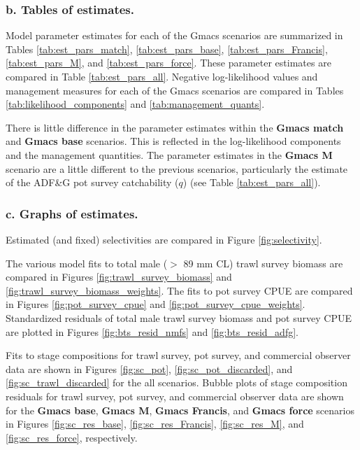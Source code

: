 \documentclass[]{article}
\begin{document}
\subsubsection{b. Tables of estimates.}\label{b.-tables-of-estimates.}

Model parameter estimates for each of the Gmacs scenarios are summarized
in Tables \ref{tab:est_pars_match}, \ref{tab:est_pars_base},
\ref{tab:est_pars_Francis}, \ref{tab:est_pars_M}, and
\ref{tab:est_pars_force}. These parameter estimates are compared in
Table \ref{tab:est_pars_all}. Negative log-likelihood values and
management measures for each of the Gmacs scenarios are compared in
Tables \ref{tab:likelihood_components} and \ref{tab:management_quants}.

There is little difference in the parameter estimates within the
\textbf{Gmacs match} and \textbf{Gmacs base} scenarios. This is
reflected in the log-likelihood components and the management
quantities. The parameter estimates in the \textbf{Gmacs M} scenario are
a little different to the previous scenarios, particularly the estimate
of the ADF\&G pot survey catchability (\(q\)) (see Table
\ref{tab:est_pars_all}).

\subsubsection{c. Graphs of estimates.}\label{c.-graphs-of-estimates.}

Estimated (and fixed) selectivities are compared in Figure
\ref{fig:selectivity}.

The various model fits to total male (\(>\) 89 mm CL) trawl survey
biomass are compared in Figures \ref{fig:trawl_survey_biomass} and
\ref{fig:trawl_survey_biomass_weights}. The fits to pot survey CPUE are
compared in Figures \ref{fig:pot_survey_cpue} and
\ref{fig:pot_survey_cpue_weights}. Standardized residuals of total male
trawl survey biomass and pot survey CPUE are plotted in Figures
\ref{fig:bts_resid_nmfs} and \ref{fig:bts_resid_adfg}.

Fits to stage compositions for trawl survey, pot survey, and commercial
observer data are shown in Figures \ref{fig:sc_pot},
\ref{fig:sc_pot_discarded}, and \ref{fig:sc_trawl_discarded} for the all
scenarios. Bubble plots of stage composition residuals for trawl survey,
pot survey, and commercial observer data are shown for the \textbf{Gmacs
base}, \textbf{Gmacs M}, \textbf{Gmacs Francis}, and \textbf{Gmacs
force} scenarios in Figures \ref{fig:sc_res_base},
\ref{fig:sc_res_Francis}, \ref{fig:sc_res_M}, and
\ref{fig:sc_res_force}, respectively.
\end{document}
